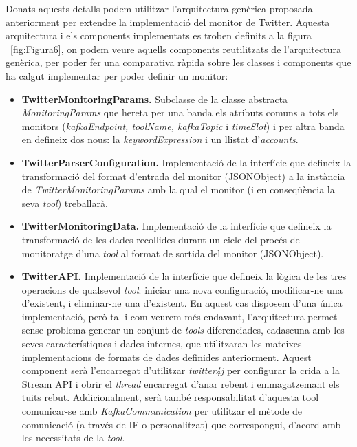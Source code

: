 Donats aquests detalls podem utilitzar l'arquitectura genèrica proposada anteriorment per extendre la implementació del monitor de Twitter. Aquesta arquitectura i els components implementats es troben definits a la figura ~\ref{fig:Figura6}, on podem veure aquells components reutilitzats de l'arquitectura genèrica, per poder fer una comparativa ràpida sobre les classes i components que ha calgut implementar per poder definir un monitor:

\begin{itemize}
\item \textbf{TwitterMonitoringParams.} Subclasse de la classe abstracta \textit{MonitoringParams} que hereta per una banda els atributs comuns a tots els monitors (\textit{kafkaEndpoint, toolName, kafkaTopic} i \textit{timeSlot}) i per altra banda en defineix dos nous: la \textit{keywordExpression} i un llistat d'\textit{accounts}.
\item \textbf{TwitterParserConfiguration.} Implementació de la interfície que defineix la transformació del format d'entrada del monitor (JSONObject) a la instància de \textit{TwitterMonitoringParams} amb la qual el monitor (i en conseqüència la seva \textit{tool}) treballarà.
\item \textbf{TwitterMonitoringData.} Implementació de la interfície que defineix la transformació de les dades recollides durant un cicle del procés de monitoratge d'una \textit{tool} al format de sortida del monitor (JSONObject).
\item \textbf{TwitterAPI.} Implementació de la interfície que defineix la lògica de les tres operacions de qualsevol \textit{tool}: iniciar una nova configuració, modificar-ne una d'existent, i eliminar-ne una d'existent. En aquest cas disposem d'una única implementació, però tal i com veurem més endavant, l'arquitectura permet sense problema generar un conjunt de \textit{tools} diferenciades, cadascuna amb les seves característiques i dades internes, que utilitzaran les mateixes implementacions de formats de dades definides anteriorment. Aquest component serà l'encarregat d'utilitzar \textit{twitter4j} per configurar la crida a la Stream API i obrir el \textit{thread} encarregat d'anar rebent i emmagatzemant els tuits rebut. Addicionalment, serà també responsabilitat d'aquesta tool comunicar-se amb \textit{KafkaCommunication} per utilitzar el mètode de comunicació (a través de IF o personalitzat) que correspongui, d'acord amb les necessitats de la \textit{tool}.
\end{itemize}

